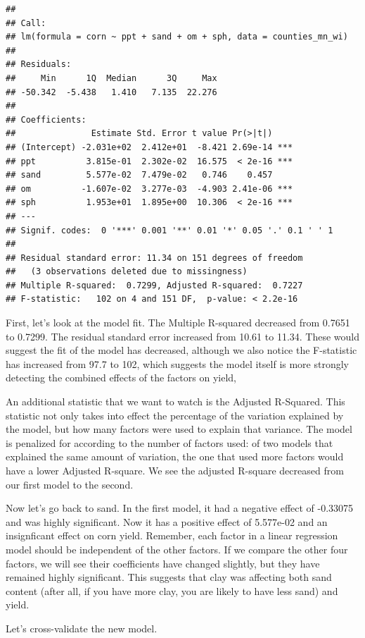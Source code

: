 \documentclass[
]{book}
\begin{document}
\begin{verbatim}
## 
## Call:
## lm(formula = corn ~ ppt + sand + om + sph, data = counties_mn_wi)
## 
## Residuals:
##     Min      1Q  Median      3Q     Max 
## -50.342  -5.438   1.410   7.135  22.276 
## 
## Coefficients:
##               Estimate Std. Error t value Pr(>|t|)    
## (Intercept) -2.031e+02  2.412e+01  -8.421 2.69e-14 ***
## ppt          3.815e-01  2.302e-02  16.575  < 2e-16 ***
## sand         5.577e-02  7.479e-02   0.746    0.457    
## om          -1.607e-02  3.277e-03  -4.903 2.41e-06 ***
## sph          1.953e+01  1.895e+00  10.306  < 2e-16 ***
## ---
## Signif. codes:  0 '***' 0.001 '**' 0.01 '*' 0.05 '.' 0.1 ' ' 1
## 
## Residual standard error: 11.34 on 151 degrees of freedom
##   (3 observations deleted due to missingness)
## Multiple R-squared:  0.7299, Adjusted R-squared:  0.7227 
## F-statistic:   102 on 4 and 151 DF,  p-value: < 2.2e-16
\end{verbatim}

First, let's look at the model fit. The Multiple R-squared decreased from 0.7651 to 0.7299. The residual standard error increased from 10.61 to 11.34. These would suggest the fit of the model has decreased, although we also notice the F-statistic has increased from 97.7 to 102, which suggests the model itself is more strongly detecting the combined effects of the factors on yield,

An additional statistic that we want to watch is the Adjusted R-Squared. This statistic not only takes into effect the percentage of the variation explained by the model, but how many factors were used to explain that variance. The model is penalized for according to the number of factors used: of two models that explained the same amount of variation, the one that used more factors would have a lower Adjusted R-square. We see the adjusted R-square decreased from our first model to the second.

Now let's go back to sand. In the first model, it had a negative effect of -0.33075 and was highly significant. Now it has a positive effect of 5.577e-02 and an insignficant effect on corn yield. Remember, each factor in a linear regression model should be independent of the other factors. If we compare the other four factors, we will see their coefficients have changed slightly, but they have remained highly significant. This suggests that clay was affecting both sand content (after all, if you have more clay, you are likely to have less sand) and yield.

Let's cross-validate the new model.
\end{document}
